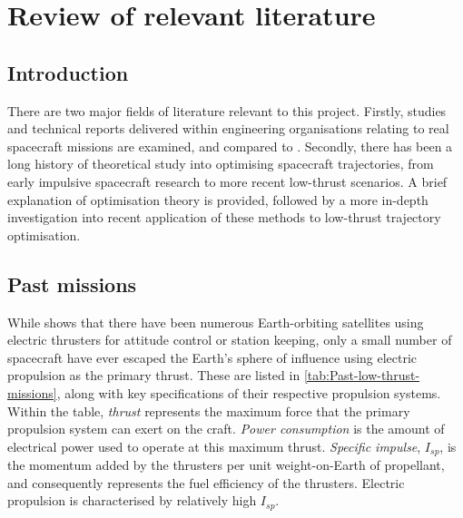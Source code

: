 \chapter{Review of relevant literature} \label{cha:Literature-review}

\section{Introduction} \label{sec:Lit-Review-Introduction}

There are two major fields of literature relevant to this project. Firstly, studies and technical reports delivered within engineering organisations relating to real spacecraft missions are examined, and compared to \BW. Secondly, there has been a long history of theoretical study into optimising spacecraft trajectories, from early impulsive spacecraft research to more recent low-thrust scenarios. A brief explanation of optimisation theory is provided, followed by a more in-depth investigation into recent application of these methods to low-thrust trajectory optimisation.

\section{Past missions} \label{sec:Past-missions}

While \textcite{LePage1991} shows that there have been numerous Earth-orbiting satellites using electric thrusters for attitude control or station keeping, only a small number of spacecraft have ever escaped the Earth's sphere of influence using electric propulsion as the primary thrust. These are listed in \autoref{tab:Past-low-thrust-missions}, along with key specifications of their respective propulsion systems. Within the table, \emph{thrust} represents the maximum force that the primary propulsion system can exert on the craft. \emph{Power consumption} is the amount of electrical power used to operate at this maximum thrust. \emph{Specific impulse}, $I_{sp}$, is the momentum added by the thrusters per unit weight-on-Earth of propellant, and consequently represents the fuel efficiency of the thrusters. Electric propulsion is characterised by relatively high $I_{sp}$.


